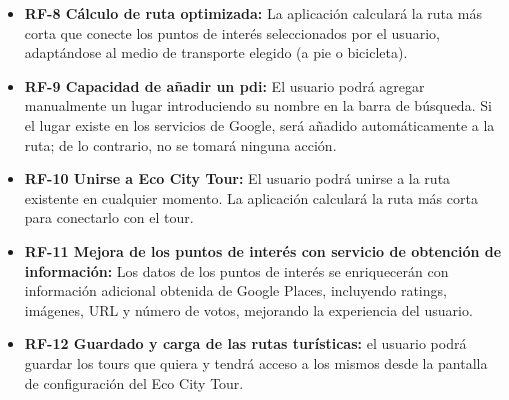 \begin{itemize}
	\item \textbf{RF-8 Cálculo de ruta optimizada:} La aplicación calculará la ruta más corta que conecte los puntos de interés seleccionados por el usuario, adaptándose al medio de transporte elegido (a pie o bicicleta).
	
	\item \textbf{RF-9 Capacidad de añadir un \acrshort{pdi}:} El usuario podrá agregar manualmente un lugar introduciendo su nombre en la barra de búsqueda. Si el lugar existe en los servicios de Google, será añadido automáticamente a la ruta; de lo contrario, no se tomará ninguna acción.
	
	\item \textbf{RF-10 Unirse a Eco City Tour:} El usuario podrá unirse a la ruta existente en cualquier momento. La aplicación calculará la ruta más corta para conectarlo con el tour.
	
	\item \textbf{RF-11 Mejora de los puntos de interés con servicio de obtención de información:} Los datos de los puntos de interés se enriquecerán con información adicional obtenida de Google Places, incluyendo ratings, imágenes, URL y número de votos, mejorando la experiencia del usuario.
	
	\item \textbf{RF-12 Guardado y carga de las rutas turísticas:} el usuario podrá guardar los tours que quiera y tendrá acceso a los mismos desde la pantalla de configuración del Eco City Tour.
	
\end{itemize}


